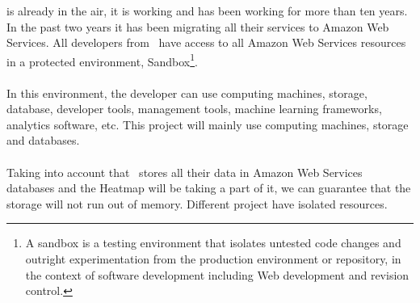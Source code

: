 \company is already in the air, it is working and has been working for more than ten years. In the past two years it has been migrating all their services to Amazon Web Services\cite{aws}. All developers from \company\ have access to all Amazon Web Services resources in a protected environment, Sandbox\footnote{A sandbox\cite{sandbox_wiki} is a testing environment that isolates untested code changes and outright experimentation from the production environment or repository, in the context of software development including Web development and revision control.}.
\\\\
In this environment, the developer can use computing machines, storage, database, developer tools, management tools, machine learning frameworks, analytics software, etc. This project will mainly use computing machines, storage and databases.
\\\\
Taking into account that \company\ stores all their data in Amazon Web Services databases and the Heatmap will be taking a part of it, we can guarantee that the storage will not run out of memory. Different project have isolated resources.



